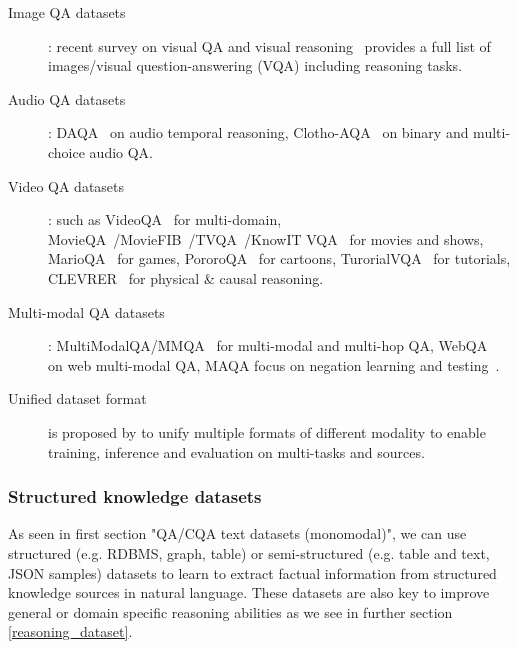 \documentclass[acmsmall]{acmart}
\begin{document}
\begin{description}
    \item [Image QA datasets]: recent survey on visual QA and visual reasoning~\citep{zakariVQAVisualReasoning2022} provides a full list of images/visual question-answering (VQA) including reasoning tasks.
    \item [Audio QA datasets]: DAQA~\citep{fayekTemporalReasoningAudio2019} on audio temporal reasoning, Clotho-AQA~\citep{lippingClothoAQACrowdsourcedDataset2022} on binary and multi-choice audio QA.
    \item [Video QA datasets]: such as VideoQA~\citep{zhongVideoQuestionAnswering2022} for multi-domain, MovieQA~\citep{tapaswiMovieQAUnderstandingStories2016}/MovieFIB~\citep{maharajDatasetExplorationModels2017}/TVQA~\citep{leiTVQALocalizedCompositional2019}/KnowIT VQA~\citep{garciaKnowITVQAAnswering2019} for movies and shows, MarioQA~\citep{munMarioQAAnsweringQuestions2017} for games, PororoQA~\citep{kimDeepStoryVideoStory2017} for cartoons, TurorialVQA~\citep{colasTutorialVQAQuestionAnswering2020} for tutorials, CLEVRER~\citep{maoCLEVRERHumansDescribingPhysical2022} for physical \& causal reasoning.
    \item [Multi-modal QA datasets]: MultiModalQA/MMQA~\citep{talmorMultiModalQAComplexQuestion2021} for multi-modal and multi-hop QA, WebQA~\citep{changWebQAMultihopMultimodal2022a} on web multi-modal QA, MAQA focus on negation learning and testing~\citep{liMAQAMultimodalQA2023}.
    \item [Unified dataset format] is proposed by \citet{xieUnifiedSKGUnifyingMultiTasking2022} to unify multiple formats of different modality to enable training, inference and evaluation on multi-tasks and sources.
\end{description}

\subsubsection{Structured knowledge datasets}
As seen in first section "QA/CQA text datasets (monomodal)", we can use structured (e.g. RDBMS, graph, table) or semi-structured (e.g. table and text, JSON samples) datasets to learn to extract factual information from structured knowledge sources in natural language. These datasets are also key to improve general or domain specific reasoning abilities as we see in further section \ref{reasoning_dataset}.
\end{document}
